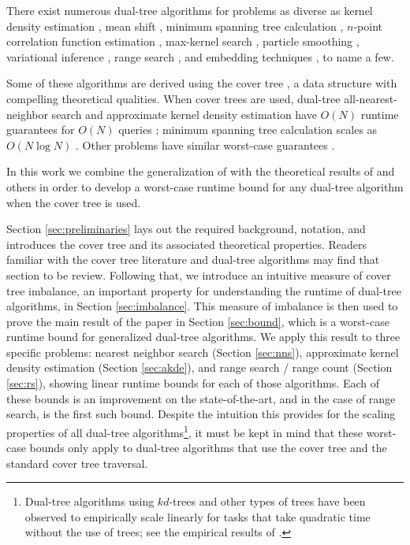 \documentclass[twoside,11pt]{article} %
\begin{document}
There exist numerous dual-tree algorithms for problems as diverse as kernel
density estimation \citep{gray2003nonparametric}, mean shift \citep{wang2007fast},
minimum spanning tree calculation \citep{march2010euclidean}, $n$-point
correlation function estimation \citep{march2012fast}, max-kernel search
\citep{curtin2013fast}, particle smoothing \citep{klaas2006fast}, variational
inference \citep{amizadeh2012variational}, range search \citep{nbody}, and
embedding techniques \citep{maaten2014accelerating}, to name a few.

Some of these algorithms are derived using the cover tree \citep{langford2006}, a
data structure with compelling theoretical qualities.  When cover trees are
used, dual-tree all-nearest-neighbor search and approximate kernel density
estimation have $O(N)$ runtime guarantees for $O(N)$ queries \citep{ram2009};
minimum spanning tree calculation scales as $O(N \log N)$
\citep{march2010euclidean}.  Other problems have similar worst-case guarantees
\citep{curtin2014dual, march2013multi}.

In this work we combine the generalization of \citet{curtin2013tree} with the
theoretical results of \citet{langford2006} and others in order to develop a
worst-case runtime bound for any dual-tree algorithm when the cover tree is
used.

Section \ref{sec:preliminaries} lays out the required background, notation, and
introduces the cover tree and its associated theoretical properties.  Readers
familiar with the cover tree literature and dual-tree algorithms
\citep[especially][]{curtin2013tree} may find that section to be review.
Following that, we introduce an intuitive measure of cover tree imbalance, an
important property for understanding the runtime of dual-tree algorithms, in
Section \ref{sec:imbalance}.  This measure of imbalance is then used to prove
the main result of the paper in Section \ref{sec:bound}, which is a worst-case
runtime bound for generalized dual-tree algorithms.  We apply this result to
three specific problems: nearest neighbor search (Section \ref{sec:nns}),
approximate kernel density estimation (Section \ref{sec:akde}), and range search
/ range count (Section \ref{sec:rs}), showing linear runtime bounds for each of
those algorithms.  Each of these bounds is an improvement on the
state-of-the-art, and in the case of range search, is the first such bound.
Despite the intuition this provides for the scaling properties of all dual-tree
algorithms\footnote{Dual-tree algorithms using $kd$-trees and other types of
trees have been observed to empirically scale linearly for tasks that take
quadratic time without the use of trees; see the empirical results of
\citet{nbody, march2010euclidean, vladymyrov2014linear, klaas2006fast,
gray2003nonparametric}.}, it must be kept in mind that these worst-case bounds
only apply to dual-tree algorithms that use the cover tree and the standard
cover tree traversal.
\end{document}

